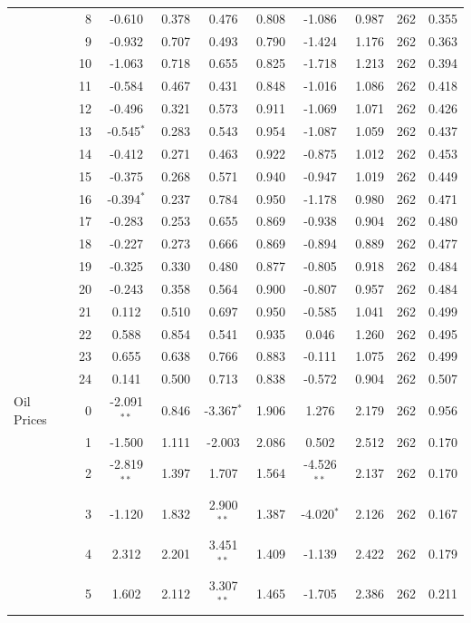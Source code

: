 \begin{longtable}[t]{lrcccccccc}
 & 8 & -0.610 & 0.378 & 0.476 & 0.808 & -1.086 & 0.987 & 262 & 0.355\\
 & 9 & -0.932 & 0.707 & 0.493 & 0.790 & -1.424 & 1.176 & 262 & 0.363\\
 & 10 & -1.063 & 0.718 & 0.655 & 0.825 & -1.718 & 1.213 & 262 & 0.394\\
 & 11 & -0.584 & 0.467 & 0.431 & 0.848 & -1.016 & 1.086 & 262 & 0.418\\
 & 12 & -0.496 & 0.321 & 0.573 & 0.911 & -1.069 & 1.071 & 262 & 0.426\\
 & 13 & -0.545$^{*}$ & 0.283 & 0.543 & 0.954 & -1.087 & 1.059 & 262 & 0.437\\
 & 14 & -0.412 & 0.271 & 0.463 & 0.922 & -0.875 & 1.012 & 262 & 0.453\\
 & 15 & -0.375 & 0.268 & 0.571 & 0.940 & -0.947 & 1.019 & 262 & 0.449\\
 & 16 & -0.394$^{*}$ & 0.237 & 0.784 & 0.950 & -1.178 & 0.980 & 262 & 0.471\\
 & 17 & -0.283 & 0.253 & 0.655 & 0.869 & -0.938 & 0.904 & 262 & 0.480\\
 & 18 & -0.227 & 0.273 & 0.666 & 0.869 & -0.894 & 0.889 & 262 & 0.477\\
 & 19 & -0.325 & 0.330 & 0.480 & 0.877 & -0.805 & 0.918 & 262 & 0.484\\
 & 20 & -0.243 & 0.358 & 0.564 & 0.900 & -0.807 & 0.957 & 262 & 0.484\\
 & 21 & 0.112 & 0.510 & 0.697 & 0.950 & -0.585 & 1.041 & 262 & 0.499\\
 & 22 & 0.588 & 0.854 & 0.541 & 0.935 & 0.046 & 1.260 & 262 & 0.495\\
 & 23 & 0.655 & 0.638 & 0.766 & 0.883 & -0.111 & 1.075 & 262 & 0.499\\
 & 24 & 0.141 & 0.500 & 0.713 & 0.838 & -0.572 & 0.904 & 262 & 0.507\\
\midrule
Oil Prices & 0 & -2.091$^{**}$ & 0.846 & -3.367$^{*}$ & 1.906 & 1.276 & 2.179 & 262 & 0.956\\
 & 1 & -1.500 & 1.111 & -2.003 & 2.086 & 0.502 & 2.512 & 262 & 0.170\\
 & 2 & -2.819$^{**}$ & 1.397 & 1.707 & 1.564 & -4.526$^{**}$ & 2.137 & 262 & 0.170\\
 & 3 & -1.120 & 1.832 & 2.900$^{**}$ & 1.387 & -4.020$^{*}$ & 2.126 & 262 & 0.167\\
 & 4 & 2.312 & 2.201 & 3.451$^{**}$ & 1.409 & -1.139 & 2.422 & 262 & 0.179\\
 & 5 & 1.602 & 2.112 & 3.307$^{**}$ & 1.465 & -1.705 & 2.386 & 262 & 0.211\\

\end{longtable}
